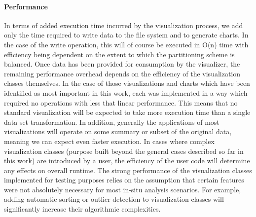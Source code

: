 \paragraph{Performance}
In terms of added execution time incurred by the visualization process, we add only the time required to write data to the file system and to generate charts. In the case of the write operation, this will of course be executed in O(n) time with efficiency being dependent on the extent to which the partitioning scheme is balanced. Once data has been provided for consumption by the visualizer, the remaining performance overhead depends on the efficiency of the visualization classes themselves. In the case of those visualizations and charts which have been identified as most important in this work, each was implemented in a way which required no operations with less that linear performance. This means that no standard visualization will be expected to take more execution time than a single data set transformation. In addition, generally the applications of most visualizations will operate on some summary or subset of the original data, meaning we can expect even faster execution. In cases where complex visualization classes (purpose built beyond the general cases described so far in this work) are introduced by a user, the efficiency of the user code will determine any effects on overall runtime. The strong performance of the visualization classes implemented for testing purposes relies on the assumption that certain features were not absolutely necessary for most in-situ analysis scenarios. For example, adding automatic sorting or outlier detection to visualization classes will significantly increase their algorithmic complexities.
